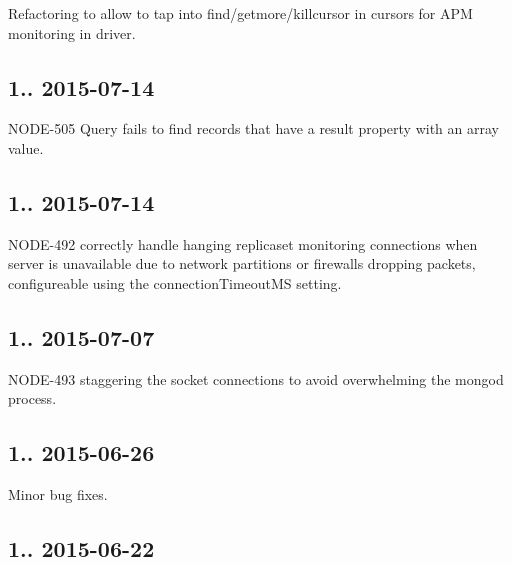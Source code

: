 \begin{DoxyItemize}
\item Refactoring to allow to tap into find/getmore/killcursor in cursors for A\+PM monitoring in driver.
\end{DoxyItemize}

\subsection*{1.. 2015-\/07-\/14 }


\begin{DoxyItemize}
\item N\+O\+D\+E-\/505 Query fails to find records that have a \textquotesingle{}result\textquotesingle{} property with an array value.
\end{DoxyItemize}

\subsection*{1.. 2015-\/07-\/14 }


\begin{DoxyItemize}
\item N\+O\+D\+E-\/492 correctly handle hanging replicaset monitoring connections when server is unavailable due to network partitions or firewalls dropping packets, configureable using the connection\+Timeout\+MS setting.
\end{DoxyItemize}

\subsection*{1.. 2015-\/07-\/07 }


\begin{DoxyItemize}
\item N\+O\+D\+E-\/493 staggering the socket connections to avoid overwhelming the mongod process.
\end{DoxyItemize}

\subsection*{1.. 2015-\/06-\/26 }


\begin{DoxyItemize}
\item Minor bug fixes.
\end{DoxyItemize}

\subsection*{1.. 2015-\/06-\/22 }


